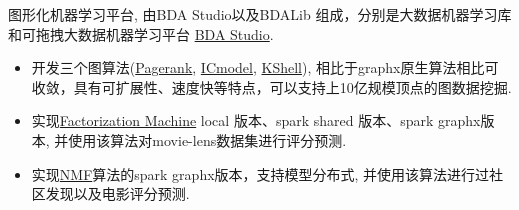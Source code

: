 \documentclass{resume}
\begin{document}
\begin{onehalfspacing}
图形化机器学习平台, 由BDA Studio以及BDALib 组成，分别是大数据机器学习库和可拖拽大数据机器学习平台 \href{http://bda.space:18080}{BDA Studio}.
\begin{itemize}
  \item 开发三个图算法(\href{http://bda.space:18080/BDAStudioMonitor.html?job=0000001-160229111630187-oozie-oozi-W}{Pagerank}, \href{http://bda.space:18080/BDAStudioMonitor.html?job=0000015-160229111630187-oozie-oozi-W}{ICmodel}, \href{http://bda.space:18080/BDAStudioMonitor.html?job=0000206-151222123224608-oozie-oozi-W}{KShell}), 相比于graphx原生算法相比可收敛，具有可扩展性、速度快等特点，可以支持上10亿规模顶点的图数据挖掘.
  \item 实现\href{http://bda.space:18080/BDAStudioMonitor.html?job=0000009-160229111630187-oozie-oozi-W}{Factorization Machine} local 版本、spark shared 版本、spark graphx版本, 并使用该算法对movie-lens数据集进行评分预测.
  \item 实现\href{http://bda.space:18080/BDAStudioMonitor.html?job=0000021-160229111630187-oozie-oozi-W}{NMF}算法的spark graphx版本，支持模型分布式, 并使用该算法进行过社区发现以及电影评分预测.
\end{itemize}
\end{onehalfspacing}



\end{document}
